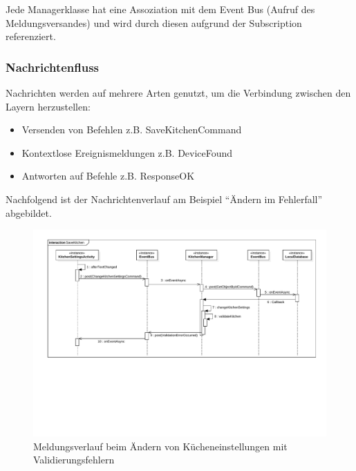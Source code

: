 Jede Managerklasse hat eine Assoziation mit dem Event Bus (Aufruf des Meldungsversandes) und wird durch diesen aufgrund der Subscription referenziert.

\subsubsection{Nachrichtenfluss}
Nachrichten werden auf mehrere Arten genutzt, um die Verbindung zwischen den Layern herzustellen:

\begin{itemize}
\item{Versenden von Befehlen z.B. SaveKitchenCommand}
\item{Kontextlose Ereignismeldungen z.B. DeviceFound}
\item{Antworten auf Befehle z.B. ResponseOK}
\end{itemize}

Nachfolgend ist der Nachrichtenverlauf am Beispiel \enquote{Ändern im Fehlerfall} abgebildet.

\begin{figure}[H]
    \begin{center}
        \includegraphics[trim=40 225 30 30,clip,scale=0.55]{results/res/messages}
    \end{center}
    \caption{Meldungsverlauf beim Ändern von Kücheneinstellungen mit Validierungsfehlern}
    \label{abb:messages}
\end{figure}

